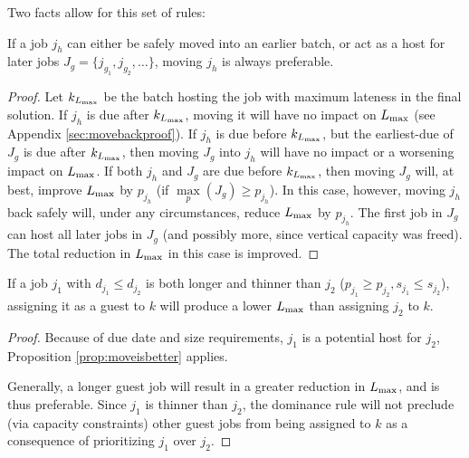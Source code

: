 \documentclass[13pt, letterpaper, oneside]{book}
\begin{document}
Two facts allow for this set of rules:
\begin{proposition}If a job $j_h$ can either be safely moved into an earlier batch,
\textrm{or} act as a host for later jobs $J_g = \{j_{g_1}, j_{g_2}, \dots\}$,
moving $j_h$ is always preferable. \label{prop:moveisbetter}

\begin{proof}
Let $k_{L_{\text{max}}}$ be the batch hosting the job with maximum lateness in the final
solution. If $j_h$ is due after $k_{L_{\text{max}}}$, moving it will have no impact on
$L_{\text{max}}$ (see Appendix \ref{sec:movebackproof}). If $j_h$ is due before
$k_{L_{\text{max}}}$, but the earliest-due of $J_g$ is due after $k_{L_{\text{max}}}$, then moving
$J_g$ into $j_h$ will have no impact or a worsening impact on $L_{\text{max}}$. If both
$j_h$ and $J_g$ are due before $k_{L_{\text{max}}}$, then moving $J_g$ will, at best,
improve $L_{\text{max}}$ by $p_{j_h}$ (if $\underset{p}{\max}(J_g) \geq p_{j_h}$). In
this case, however, moving $j_h$ back safely will, under any circumstances,
reduce $L_{\text{max}}$ by $p_{j_h}$. The first job in $J_g$ can host all later jobs in
$J_g$ (and possibly more, since vertical capacity was freed). The total
reduction in $L_{\text{max}}$ in this case is improved.
\end{proof}
\end{proposition}

\begin{proposition} If a job $j_1$ with $d_{j_1} \leq d_{j_2}$ is both longer
and thinner than $j_2$ ($p_{j_1} \geq p_{j_2}, s_{j_1} \leq s_{j_2}$), assigning
it as a guest to $k$ will produce a lower $L_{\text{max}}$ than assigning $j_2$ to $k$.

\begin{proof}
Because of due date and size requirements, $j_1$ is a potential host for $j_2$,
Proposition \ref{prop:moveisbetter} applies. 

Generally, a longer guest job will result in a greater reduction in $L_{\text{max}}$, and
is thus preferable. Since $j_1$ is thinner than $j_2$, the dominance rule will
not preclude (via capacity constraints) other guest jobs from being assigned to
$k$ as a consequence of prioritizing $j_1$ over $j_2$.
\end{proof}
\end{proposition}





\end{document}
